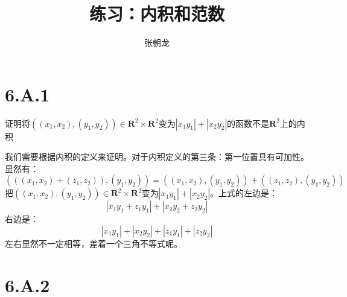 \documentclass[10pt,a4paper,UTF8]{article}
\author{张朝龙}
\date{}
\title{练习：内积和范数}
\begin{document}
\maketitle
\tableofcontents
{}

\section{6.A.1}
\label{sec:org1e334b2}


\begin{tikzproblem}
证明将\(((x_{1},x_{2}), (y_{1},y_{2}))\in \mathbf{R}^{2}\times \mathbf{R}^{2}\)变为\(|x_{1}y_{1}| + |x_{2}y_{2}|\)的函数不是\(\mathbf{R}^{2}\)上的内积
\end{tikzproblem}

\begin{tikzanswer}
我们需要根据内积的定义来证明。对于内积定义的第三条：第一位置具有可加性。显然有：
\begin{equation}
\label{eq:1}
(((x_{1},x_{2})+(z_{1},z_{2})),(y_{1},y_{2})) = ((x_{1},x_{2}), (y_{1},y_{2})) +((z_{1},z_{2}), (y_{1},y_{2}))
\end{equation}
把\(((x_{1},x_{2}), (y_{1},y_{2}))\in \mathbf{R}^{2}\times \mathbf{R}^{2}\)变为\(|x_{1}y_{1}| + |x_{2}y_{2}|\)。上式的左边是：
\begin{equation}
\label{eq:2}
|x_1y_1 + z_1y_1| + |x_2y_2 + z_2y_2|
\end{equation}
右边是：
\begin{equation}
\label{eq:3}
|x_1y_1| + |x_2y_2| + |z_1y_1| + |z_2y_2|
\end{equation}
左右显然不一定相等，差着一个三角不等式呢。
\end{tikzanswer}
\section{6.A.2}
\label{sec:orgbae0717}
\end{document}
